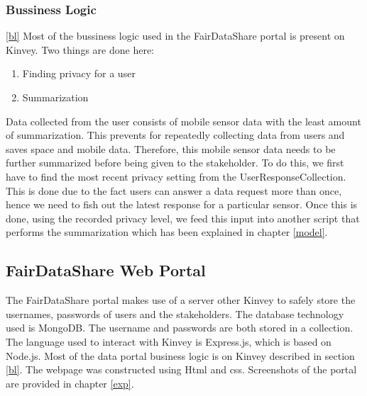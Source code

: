 \subsubsection{Bussiness Logic} \ref{bl}
Most of the bussiness logic used in the FairDataShare portal is present on Kinvey. Two things are done here:
\begin{enumerate}
    \item Finding privacy for a user
    \item Summarization
\end{enumerate}
Data collected from the user consists of mobile sensor data with the least amount of summarization. This prevents for repeatedly
collecting data from users and saves space and mobile data. Therefore, this mobile sensor data needs to be further summarized before being given to the stakeholder. To do this, we first have to find the most recent privacy setting from the UserResponseCollection. This is done due to the fact users can answer a data request more than once, hence we need to fish out the latest response for a particular sensor. Once this is done, using the recorded privacy level, we feed this input into another script that performs the summarization which has been explained in chapter \ref{model}.

\subsection{FairDataShare Web Portal}
The FairDataShare portal makes use of a server other Kinvey to safely store the usernames, passwords of users and the stakeholders. The database
technology used is MongoDB. The username and passwords are both stored in a collection. The language used to interact with Kinvey is Express.js, which is based on Node.js. Most of the data portal business logic is on Kinvey described in section \ref{bl}. The webpage was constructed using Html and css. Screenshots of the portal are provided in chapter \ref{exp}.









